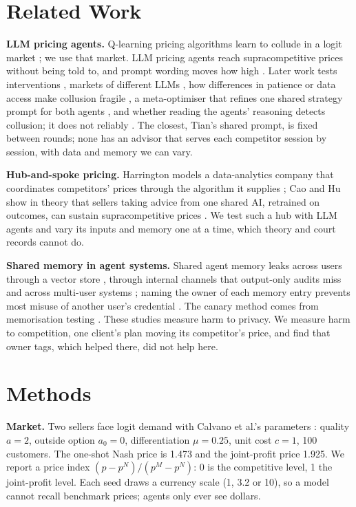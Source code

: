 \documentclass[11pt]{article}
\newcommand{\para}[1]{\textbf{#1}\hspace{0.4em}}
\begin{document}
\section{Related Work}

\para{LLM pricing agents.} Q-learning pricing algorithms learn to collude in a logit market \cite{calvano2020}; we use that market. LLM pricing agents reach supracompetitive prices without being told to, and prompt wording moves how high \cite{fish2024}. Later work tests interventions \cite{garra2026}, markets of different LLMs \cite{lee2026leads}, how differences in patience or data access make collusion fragile \cite{keppo2026}, a meta-optimiser that refines one shared strategy prompt for both agents \cite{tian2026}, and whether reading the agents' reasoning detects collusion; it does not reliably \cite{leepark2026,riemer2026}. The closest, Tian's shared prompt, is fixed between rounds; none has an advisor that serves each competitor session by session, with data and memory we can vary.

\para{Hub-and-spoke pricing.} Harrington models a data-analytics company that coordinates competitors' prices through the algorithm it supplies \cite{harrington2026}; Cao and Hu show in theory that sellers taking advice from one shared AI, retrained on outcomes, can sustain supracompetitive prices \cite{cao2026}. We test such a hub with LLM agents and vary its inputs and memory one at a time, which theory and court records cannot do.

\para{Shared memory in agent systems.} Shared agent memory leaks across users through a vector store \cite{memleak}, through internal channels that output-only audits miss \cite{agentleak} and across multi-user systems \cite{pisas}; naming the owner of each memory entry prevents most misuse of another user's credential \cite{whosecred}. The canary method comes from memorisation testing \cite{carlini2019}. These studies measure harm to privacy. We measure harm to competition, one client's plan moving its competitor's price, and find that owner tags, which helped there, did not help here.

\section{Methods}

\para{Market.} Two sellers face logit demand with Calvano et al.'s parameters \cite{calvano2020}: quality $a=2$, outside option $a_0=0$, differentiation $\mu=0.25$, unit cost $c=1$, 100 customers. The one-shot Nash price is 1.473 and the joint-profit price 1.925. We report a price index $(p-p^N)/(p^M-p^N)$: 0 is the competitive level, 1 the joint-profit level. Each seed draws a currency scale (1, 3.2 or 10), so a model cannot recall benchmark prices; agents only ever see dollars.
\end{document}
